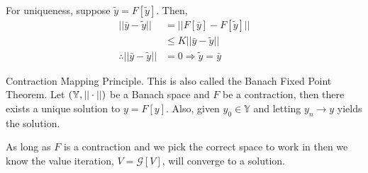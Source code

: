 For uniqueness, suppose $\tilde{y}=F[\tilde{y}]$. Then,
\begin{align*}
||\bar{y}-\tilde{y}|| &= ||F[\bar{y}]-F[\tilde{y}]|| \\
&\leq K||\bar{y}-\tilde{y}|| \\
\therefore ||\bar{y}-\tilde{y}|| &= 0 \Rightarrow \tilde{y} = \bar{y}
\end{align*}

\begin{theorem}{Contraction Mapping Principle.}
\label{th:bfp}
This is also called the Banach Fixed Point Theorem. Let $(\mathbb{Y},||\cdot||)$ be a Banach space and $F$ be a contraction, then there exists a unique solution to $y=F[y]$. Also, given $y_0\in\mathbb{Y}$ and letting $y_n\to y$ yields the solution.
\end{theorem}

As long as $F$ is a contraction and we pick the correct space to work in then we know the value iteration, $V=\mathcal{G}[V]$, will converge to a solution.

